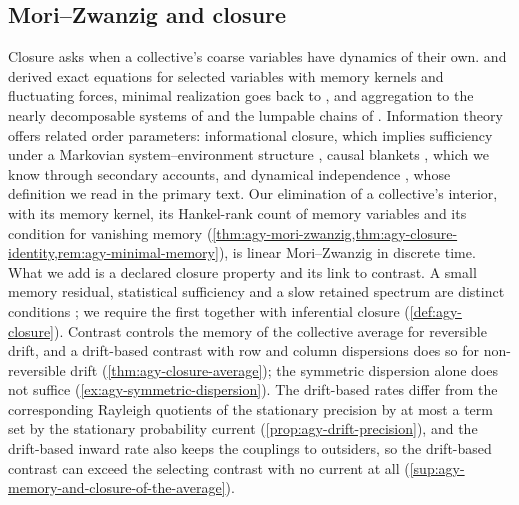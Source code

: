 \subsection{Mori--Zwanzig and closure}\label{sec:rel-closure}

Closure asks when a collective's coarse variables have dynamics of their own. \citet{zwanzig1961memory} and \citet{mori1965transport} derived exact equations for selected variables with memory kernels and fluctuating forces, minimal realization goes back to \citet{ho1966effective}, and aggregation to the nearly decomposable systems of \citet{simon1961aggregation} and the lumpable chains of \citet{kemeny1960finite}. Information theory offers related order parameters: informational closure, which implies sufficiency under a Markovian system--environment structure \citep{krakauer2020information}, causal blankets \citep{rosas2020causal}, which we know through secondary accounts, and dynamical independence \citep{barnett2023dynamical}, whose definition we read in the primary text. Our elimination of a collective's interior, with its memory kernel, its Hankel-rank count of memory variables and its condition for vanishing memory (\cref{thm:agy-mori-zwanzig,thm:agy-closure-identity,rem:agy-minimal-memory}), is linear Mori--Zwanzig in discrete time. What we add is a declared closure property and its link to contrast. A small memory residual, statistical sufficiency and a slow retained spectrum are distinct conditions \citep{dennis2026participatory}; we require the first together with inferential closure (\cref{def:agy-closure}). Contrast controls the memory of the collective average for reversible drift, and a drift-based contrast with row and column dispersions does so for non-reversible drift (\cref{thm:agy-closure-average}); the symmetric dispersion alone does not suffice (\cref{ex:agy-symmetric-dispersion}). The drift-based rates differ from the corresponding Rayleigh quotients of the stationary precision by at most a term set by the stationary probability current (\cref{prop:agy-drift-precision}), and the drift-based inward rate also keeps the couplings to outsiders, so the drift-based contrast can exceed the selecting contrast with no current at all (\cref{sup:agy-memory-and-closure-of-the-average}).

